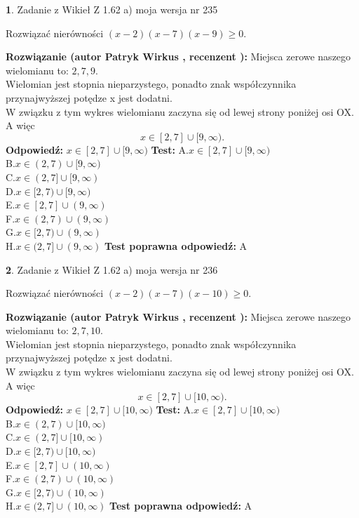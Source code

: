 \documentclass[12pt, a4paper]{article}
\theoremstyle{definition} %
\newtheorem{zad}{}
\newcommand{\zadStart}[1]{\begin{zad}#1\newline}
\newcommand{\zadStop}{\end{zad}}
\newcommand{\rozwStart}[2]{\noindent \textbf{Rozwiązanie (autor #1 , recenzent #2): }\newline}
\newcommand{\rozwStop}{\newline}
\newcommand{\odpStart}{\noindent \textbf{Odpowiedź:}\newline}
\newcommand{\odpStop}{\newline}
\newcommand{\testStart}{\noindent \textbf{Test:}\newline}
\newcommand{\testStop}{\newline}
\newcommand{\kluczStart}{\noindent \textbf{Test poprawna odpowiedź:}\newline}
\newcommand{\kluczStop}{\newline}
\begin{document}
\zadStart{Zadanie z Wikieł Z 1.62 a) moja wersja nr 235}

Rozwiązać nierówności $(x-2)(x-7)(x-9)\ge0$.
\zadStop
\rozwStart{Patryk Wirkus}{}
Miejsca zerowe naszego wielomianu to: $2, 7, 9$.\\
Wielomian jest stopnia nieparzystego, ponadto znak współczynnika przy\linebreak najwyższej potędze x jest dodatni.\\ W związku z tym wykres wielomianu zaczyna się od lewej strony poniżej osi OX. A więc $$x \in [2,7] \cup [9,\infty).$$
\rozwStop
\odpStart
$x \in [2,7] \cup [9,\infty)$
\odpStop
\testStart
A.$x \in [2,7] \cup [9,\infty)$\\
B.$x \in (2,7) \cup [9,\infty)$\\
C.$x \in (2,7] \cup [9,\infty)$\\
D.$x \in [2,7) \cup [9,\infty)$\\
E.$x \in [2,7] \cup (9,\infty)$\\
F.$x \in (2,7) \cup (9,\infty)$\\
G.$x \in [2,7) \cup (9,\infty)$\\
H.$x \in (2,7] \cup (9,\infty)$
\testStop
\kluczStart
A
\kluczStop



\zadStart{Zadanie z Wikieł Z 1.62 a) moja wersja nr 236}

Rozwiązać nierówności $(x-2)(x-7)(x-10)\ge0$.
\zadStop
\rozwStart{Patryk Wirkus}{}
Miejsca zerowe naszego wielomianu to: $2, 7, 10$.\\
Wielomian jest stopnia nieparzystego, ponadto znak współczynnika przy\linebreak najwyższej potędze x jest dodatni.\\ W związku z tym wykres wielomianu zaczyna się od lewej strony poniżej osi OX. A więc $$x \in [2,7] \cup [10,\infty).$$
\rozwStop
\odpStart
$x \in [2,7] \cup [10,\infty)$
\odpStop
\testStart
A.$x \in [2,7] \cup [10,\infty)$\\
B.$x \in (2,7) \cup [10,\infty)$\\
C.$x \in (2,7] \cup [10,\infty)$\\
D.$x \in [2,7) \cup [10,\infty)$\\
E.$x \in [2,7] \cup (10,\infty)$\\
F.$x \in (2,7) \cup (10,\infty)$\\
G.$x \in [2,7) \cup (10,\infty)$\\
H.$x \in (2,7] \cup (10,\infty)$
\testStop
\kluczStart
A
\kluczStop
\end{document}
